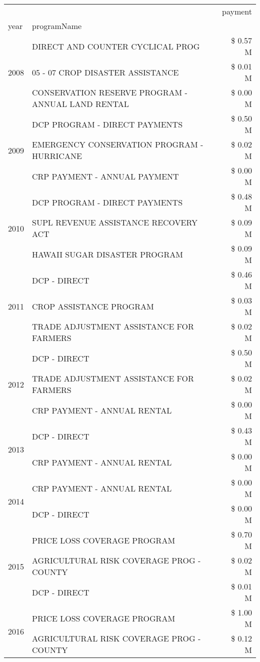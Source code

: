 \begin{tabular}{llr}
\toprule
 &  & payment \\
year & programName &  \\
\midrule
\multirow[t]{3}{*}{2008} & DIRECT AND COUNTER CYCLICAL PROG & \$ 0.57 M \\
 & 05 - 07 CROP DISASTER ASSISTANCE & \$ 0.01 M \\
 & CONSERVATION RESERVE PROGRAM - ANNUAL LAND RENTAL & \$ 0.00 M \\
\cline{1-3}
\multirow[t]{3}{*}{2009} & DCP PROGRAM - DIRECT PAYMENTS & \$ 0.50 M \\
 & EMERGENCY CONSERVATION PROGRAM - HURRICANE & \$ 0.02 M \\
 & CRP PAYMENT - ANNUAL PAYMENT & \$ 0.00 M \\
\cline{1-3}
\multirow[t]{3}{*}{2010} & DCP PROGRAM - DIRECT PAYMENTS & \$ 0.48 M \\
 & SUPL REVENUE ASSISTANCE RECOVERY ACT & \$ 0.09 M \\
 & HAWAII SUGAR DISASTER PROGRAM & \$ 0.09 M \\
\cline{1-3}
\multirow[t]{3}{*}{2011} & DCP - DIRECT & \$ 0.46 M \\
 & CROP ASSISTANCE PROGRAM & \$ 0.03 M \\
 & TRADE ADJUSTMENT ASSISTANCE FOR FARMERS & \$ 0.02 M \\
\cline{1-3}
\multirow[t]{3}{*}{2012} & DCP - DIRECT & \$ 0.50 M \\
 & TRADE ADJUSTMENT ASSISTANCE FOR FARMERS & \$ 0.02 M \\
 & CRP PAYMENT - ANNUAL RENTAL & \$ 0.00 M \\
\cline{1-3}
\multirow[t]{2}{*}{2013} & DCP - DIRECT & \$ 0.43 M \\
 & CRP PAYMENT - ANNUAL RENTAL & \$ 0.00 M \\
\cline{1-3}
\multirow[t]{2}{*}{2014} & CRP PAYMENT - ANNUAL RENTAL & \$ 0.00 M \\
 & DCP - DIRECT & \$ 0.00 M \\
\cline{1-3}
\multirow[t]{3}{*}{2015} & PRICE LOSS COVERAGE PROGRAM & \$ 0.70 M \\
 & AGRICULTURAL RISK COVERAGE PROG - COUNTY & \$ 0.02 M \\
 & DCP - DIRECT & \$ 0.01 M \\
\cline{1-3}
\multirow[t]{3}{*}{2016} & PRICE LOSS COVERAGE PROGRAM & \$ 1.00 M \\
 & AGRICULTURAL RISK COVERAGE PROG - COUNTY & \$ 0.12 M \\

\end{tabular}
